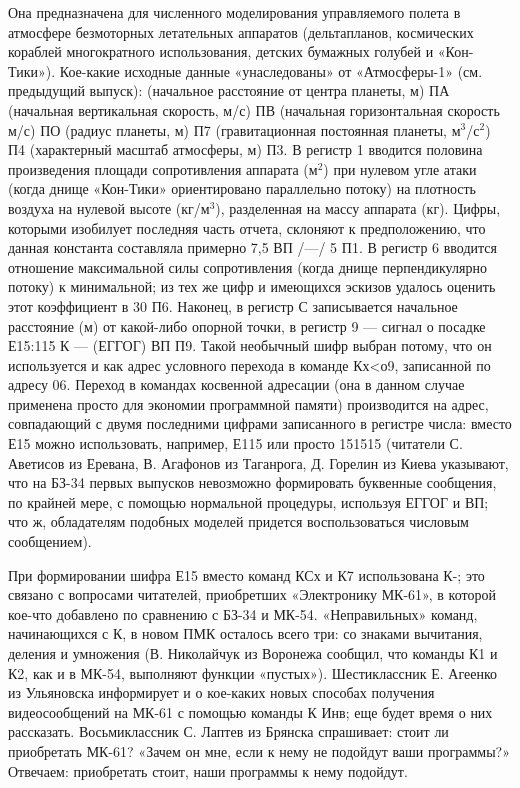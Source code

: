 \documentclass[11pt,a4paper,oneside]{article}
\begin{document}
Она предназначена для численного моделирования управляемого полета в атмосфере безмоторных летательных аппаратов (дельтапланов, космических кораблей многократного использования, детских бумажных голубей и «Кон-Тики»). Кое-какие исходные данные «унаследованы» от «Атмосферы-1» (см. предыдущий выпуск): (начальное расстояние от центра планеты, м) ПА (начальная вертикальная скорость, м/с) ПВ (начальная горизонтальная скорость м/с) ПО (радиус планеты, м) П7 (гравитационная постоянная планеты, м$^{3}$/с$^{2}$) П4 (характерный масштаб атмосферы, м) П3. В регистр 1 вводится половина произведения площади сопротивления аппарата (м$^{2}$) при нулевом угле атаки (когда днище «Кон-Тики» ориентировано параллельно потоку) на плотность воздуха на нулевой высоте (кг/м$^{3}$), разделенная на массу аппарата (кг). Цифры, которыми изобилует последняя часть отчета, склоняют к предположению, что данная константа составляла примерно 7,5 ВП /—/ 5 П1. В регистр 6 вводится отношение максимальной силы сопротивления (когда днище перпендикулярно потоку) к минимальной; из тех же цифр и имеющихся эскизов удалось оценить этот коэффициент в 30 П6. Наконец, в регистр С записывается начальное расстояние (м) от какой-либо опорной точки, в регистр 9 — сигнал о посадке Е15:115 К — (ЕГГОГ) ВП П9. Такой необычный шифр выбран потому, что он используется и как адрес условного перехода в команде Кх<о9, записанной по адресу 06. Переход в командах косвенной адресации (она в данном случае применена просто для экономии программной памяти) производится на адрес, совпадающий с двумя последними цифрами записанного в регистре числа: вместо Е15 можно использовать, например, Е115 или просто 151515 (читатели С. Аветисов из Еревана, В. Агафонов из Таганрога, Д. Горелин из Киева указывают, что на БЗ-34 первых выпусков невозможно формировать буквенные сообщения, по крайней мере, с помощью нормальной процедуры, используя ЕГГОГ и ВП; что ж, обладателям подобных моделей придется воспользоваться числовым сообщением).

При формировании шифра Е15 вместо команд КСх и К7 использована К-; это связано с вопросами читателей, приобретших «Электронику МК-61», в которой кое-что добавлено по сравнению с БЗ-34 и МК-54. «Неправильных» команд, начинающихся с К, в новом ПМК осталось всего три: со знаками вычитания, деления и умножения (В. Николайчук из Воронежа сообщил, что команды К1 и К2, как и в МК-54, выполняют функции «пустых»). Шестиклассник Е. Агеенко из Ульяновска информирует и о кое-каких новых способах получения видеосообщений на МК-61 с помощью команды К Инв; еще будет время о них рассказать. Восьмиклассник С. Лаптев из Брянска спрашивает:	стоит ли приобретать МК-61? «Зачем он мне, если к нему не подойдут ваши программы?» Отвечаем: приобретать стоит, наши программы к нему подойдут.
\end{document}
